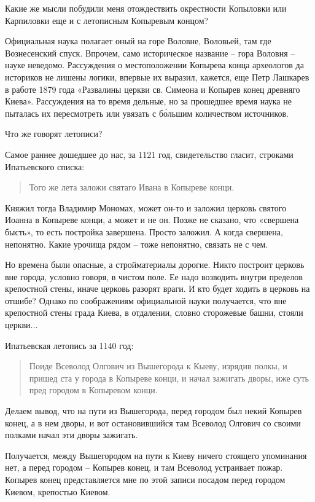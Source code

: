 Какие же мысли побудили меня отождествить окрестности Копыловки или Карпиловки еще и с летописным Копыревым концом?

Официальная наука полагает оный на горе Воловне, Воловьей, там где Вознесенский спуск. Впрочем, само историческое название – гора Воловня – науке неведомо. Рассуждения о местоположении Копырева конца археологов да историков не лишены логики, впервые их выразил, кажется, еще Петр Лашкарев в работе 1879 года «Развалины церкви св. Симеона и Копырев конец древняго Киева». Рассуждения на то время дельные, но за прошедшее время наука не пыталась их пересмотреть или увязать с б\'ольшим количеством источников.

Что же говорят летописи?

Самое раннее дошедшее до нас, за 1121 год, свидетельство гласит, строками Ипатьевского списка: 

\begin{quotation}
Того же лета заложи святаго Ивана в Копыреве конци.
\end{quotation}

Княжил тогда Владимир Мономах, может он-то и заложил церковь святого Иоанна в Копыреве конци, а может и не он. Позже не сказано, что «свершена бысть», то есть постройка завершена. Просто заложил. А когда свершена, непонятно. Какие урочища рядом – тоже непонятно, связать не с чем. 

Но времена были опасные, а стройматериалы дорогие. Никто построит церковь вне города, условно говоря, в чистом поле. Ее надо возводить внутри пределов крепостной стены, иначе церковь разорят враги. И кто будет ходить в церковь на отшибе? Однако по соображениям официальной науки получается, что вне крепостной стены града Киева, в отдалении, словно сторожевые башни, стояли церкви...

Ипатьевская летопись за 1140 год:

\begin{quotation}
Поиде Всеволод Олгович из Вышегорода к Кыеву, изрядив полкы, и пришед ста у города в Копыреве конци, и начал зажигать дворы, иже суть пред городом в Копыревом конци.\end{quotation}

Делаем вывод, что на пути из Вышегорода, перед городом был некий Копырев конец, а в нем дворы, и вот остановившийся там Всеволод Олгович со своими полками начал эти дворы зажигать.

Получается, между Вышегородом на пути к Киеву ничего стоящего упоминания нет, а перед городом – Копырев конец, и там Всеволод устраивает пожар. Копырев конец представляется мне по этой записи посадом перед городом Киевом, крепостью Киевом.

